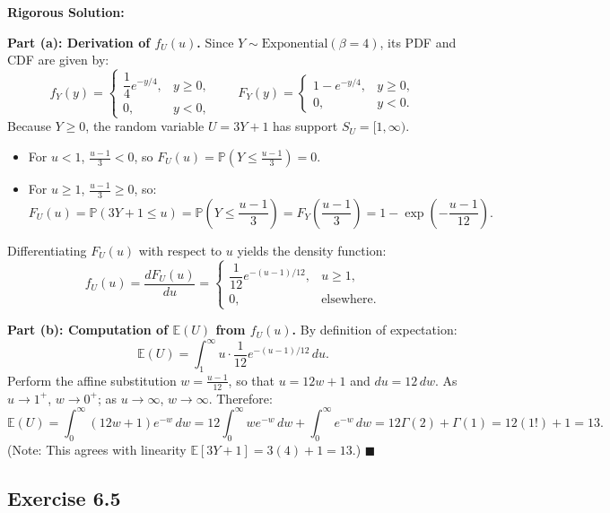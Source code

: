 \documentclass[11pt, letterpaper]{article}
\theoremstyle{definition}
\theoremstyle{remark}
\newcommand{\E}{\mathbb{E}}
\newcommand{\Prob}{\mathbb{P}}
\begin{document}
\textbf{Rigorous Solution:}

\textbf{Part (a): Derivation of $f_U(u)$.}
Since $Y \sim \text{Exponential}(\beta = 4)$, its PDF and CDF are given by:
\[
    f_Y(y) = \begin{cases} \dfrac{1}{4}e^{-y/4}, & y \ge 0, \\ 0, & y < 0, \end{cases} \qquad F_Y(y) = \begin{cases} 1 - e^{-y/4}, & y \ge 0, \\ 0, & y < 0. \end{cases}
\]
Because $Y \ge 0$, the random variable $U = 3Y + 1$ has support $S_U = [1, \infty)$.
\begin{itemize}
    \item For $u < 1$, $\frac{u - 1}{3} < 0$, so $F_U(u) = \Prob\left(Y \le \frac{u - 1}{3}\right) = 0$.
    \item For $u \ge 1$, $\frac{u - 1}{3} \ge 0$, so:
    \[
        F_U(u) = \Prob(3Y + 1 \le u) = \Prob\left(Y \le \frac{u - 1}{3}\right) = F_Y\left(\frac{u - 1}{3}\right) = 1 - \exp\left(-\frac{u - 1}{12}\right).
    \]
\end{itemize}
Differentiating $F_U(u)$ with respect to $u$ yields the density function:
\[
    f_U(u) = \frac{dF_U(u)}{du} = \begin{cases} \dfrac{1}{12}e^{-(u - 1)/12}, & u \ge 1, \\[6pt] 0, & \text{elsewhere.} \end{cases}
\]

\textbf{Part (b): Computation of $\E(U)$ from $f_U(u)$.}
By definition of expectation:
\[
    \E(U) = \int_{1}^{\infty} u \cdot \frac{1}{12}e^{-(u - 1)/12}\,du.
\]
Perform the affine substitution $w = \frac{u - 1}{12}$, so that $u = 12w + 1$ and $du = 12\,dw$. As $u \to 1^+$, $w \to 0^+$; as $u \to \infty$, $w \to \infty$. Therefore:
\[
    \E(U) = \int_{0}^{\infty} (12w + 1)e^{-w}\,dw = 12\int_{0}^{\infty} w e^{-w}\,dw + \int_{0}^{\infty} e^{-w}\,dw = 12\Gamma(2) + \Gamma(1) = 12(1!) + 1 = 13.
\]
(Note: This agrees with linearity $\E[3Y + 1] = 3(4) + 1 = 13$.) \hfill $\blacksquare$

\subsection{Exercise 6.5}
\end{document}
